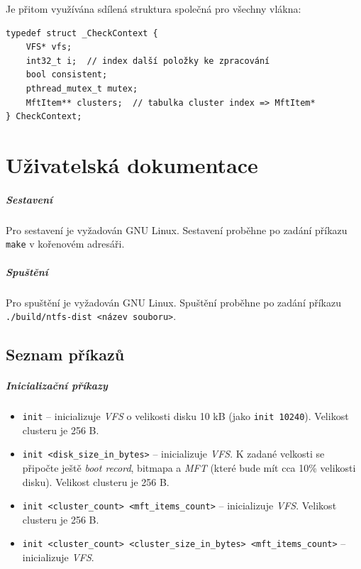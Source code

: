 \documentclass[12pt, a4paper]{report}
\begin{document}
\noindent
Je přitom využívána sdílená struktura společná pro všechny vlákna:
\begin{lstlisting}
typedef struct _CheckContext {
	VFS* vfs;
	int32_t i;  // index další položky ke zpracování
	bool consistent;
	pthread_mutex_t mutex;
	MftItem** clusters;  // tabulka cluster index => MftItem*
} CheckContext;
\end{lstlisting}


\chapter{Uživatelská dokumentace}

\paragraph{Sestavení}
Pro sestavení je vyžadován GNU Linux.
Sestavení proběhne po zadání příkazu \verb|make| v kořenovém adresáři.

\paragraph{Spuštění}
Pro spuštění je vyžadován GNU Linux.
Spuštění proběhne po zadání příkazu \verb|./build/ntfs-dist <název souboru>|.

\section{Seznam příkazů}

\paragraph{Inicializační příkazy}
\begin{itemize}
	\item \verb|init| -- inicializuje \emph{VFS} o velikosti disku 10 kB (jako \verb|init 10240|). Velikost clusteru je 256 B.
	\item \verb|init <disk_size_in_bytes>| -- inicializuje \emph{VFS}. K zadané velkosti se připočte ještě \emph{boot record}, bitmapa a \emph{MFT} (které bude mít cca 10\% velikosti disku). Velikost clusteru je 256 B.
	\item \verb|init <cluster_count> <mft_items_count>| -- inicializuje \emph{VFS}. Velikost clusteru je 256 B.
	\item \verb|init <cluster_count> <cluster_size_in_bytes> <mft_items_count>| -- inicializuje \emph{VFS}.
\end{itemize}
\end{document}
